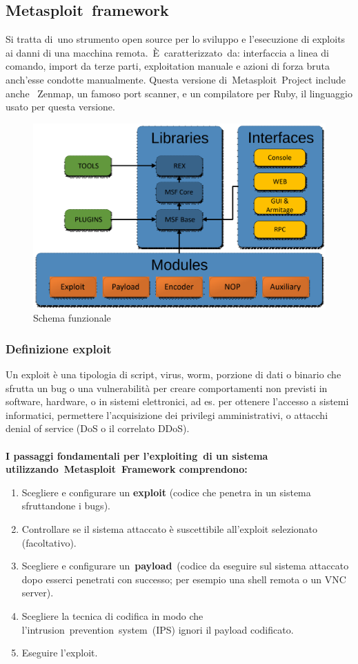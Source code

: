 \documentclass[8pt]{extarticle}
\begin{document}
\subsection{Metasploit framework}
Si tratta di uno strumento open source per lo sviluppo e l'esecuzione di exploits ai danni di una macchina 
remota. È caratterizzato da: interfaccia a linea di comando, import da terze parti, exploitation manuale e 
azioni di forza bruta anch’esse condotte manualmente. Questa versione di Metasploit Project include anche 
Zenmap, un famoso port scanner, e un compilatore per Ruby, il linguaggio usato per questa versione. 
\begin{figure}[H]
    \center
    \includegraphics[scale=0.2]{images/SchemaMetasploit.png}
    \caption{Schema funzionale}\label{fig:1}
\end{figure}
\subsubsection{Definizione exploit}
Un exploit è una tipologia di script, virus, worm, porzione di dati o binario che sfrutta un bug 
o una vulnerabilità per creare comportamenti non previsti in software, hardware, o in sistemi elettronici, 
ad es. per ottenere l'accesso a sistemi informatici, permettere l'acquisizione dei privilegi amministrativi, 
o attacchi denial of service (DoS o il correlato DDoS). \\\\
\textbf{I passaggi fondamentali per l'exploiting di un sistema utilizzando Metasploit Framework comprendono:}
\begin{enumerate}
    \item Scegliere e configurare un \textbf{exploit} (codice che penetra in un sistema sfruttandone i bugs). 
    \item Controllare se il sistema attaccato è suscettibile all’exploit selezionato (facoltativo).
    \item Scegliere e configurare un \textbf{payload} (codice da eseguire sul sistema attaccato dopo esserci 
    penetrati con successo; per esempio una shell remota o un VNC server).
    \item Scegliere la tecnica di codifica in modo che l’intrusion prevention system (IPS) ignori il payload 
    codificato. 
    \item Eseguire l’exploit.
\end{enumerate}
\end{document}
